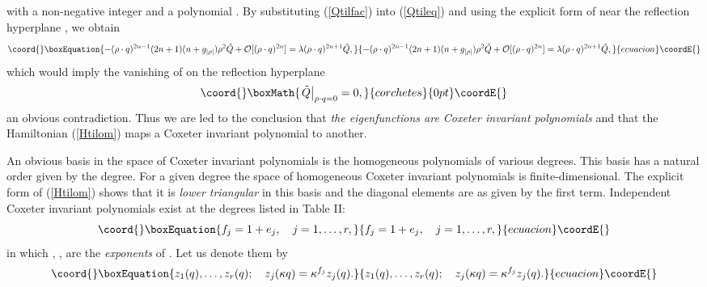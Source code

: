\documentclass[a4paper,12pt]{article}
\begin{document}
with a non-negative integer \coordHE{} and a polynomial \coordHE{}.
By substituting (\ref{Qtilfac}) into  (\ref{Qtileq}) and using the
explicit form of \coordHE{} near the reflection hyperplane
\coordHE{}, we obtain
\begin{equation}\coord{}\boxEquation{
   -(\rho\cdot q)^{2n-1}(2n+1)(n+g_{|\rho|})\rho^2\tilde{Q}
   +{\cal O}[(\rho\cdot q)^{2n}]=\lambda(\rho\cdot q)^{2n+1}\tilde{Q},
}{
   -(\rho\cdot q)^{2n-1}(2n+1)(n+g_{|\rho|})\rho^2\tilde{Q}
   +{\cal O}[(\rho\cdot q)^{2n}]=\lambda(\rho\cdot q)^{2n+1}\tilde{Q},
}{ecuacion}\coordE{}\end{equation}
which would imply the vanishing of \coordHE{} on the reflection
hyperplane
\[\coord{}\boxMath{
    \left.\tilde{Q}\right|_{\rho\cdot q=0}=0,
}{corchetes}{0pt}\coordE{}\]
an obvious contradiction.
Thus we are led to the conclusion that {\em the eigenfunctions are
Coxeter invariant polynomials\/} and that the Hamiltonian \coordHE{}
(\ref{Htilom}) maps a Coxeter invariant polynomial to another.

An obvious basis in the space of Coxeter invariant polynomials is the
homogeneous polynomials of various degrees.
This basis has a natural order given by the degree.
For a given degree the space
of homogeneous Coxeter invariant polynomials is  finite-dimensional.
The explicit form of
\coordHE{} (\ref{Htilom}) shows that it is {\em lower triangular\/}
in this basis and the diagonal elements are
\coordHE{} as given by the first term.
Independent Coxeter invariant polynomials exist
at the degrees \coordHE{} listed in
Table II:
\begin{equation}\coord{}\boxEquation{
   f_j=1+e_j,\quad j=1,\ldots,r,
   \label{coxinvdeg}
}{
   f_j=1+e_j,\quad j=1,\ldots,r,
   }{ecuacion}\coordE{}\end{equation}
in which \coordHE{}, \coordHE{}, are the {\em exponents\/} of
\myHighlight{\(\Delta\)}\coordHE{}. Let us denote them by
\begin{equation}\coord{}\boxEquation{
z_1(q),\ldots,z_r(q);\quad z_j(\kappa q)=\kappa^{f_j}z_j(q).
\label{zbasis}
}{
z_1(q),\ldots,z_r(q);\quad z_j(\kappa q)=\kappa^{f_j}z_j(q).
}{ecuacion}\coordE{}\end{equation}
\end{document}
